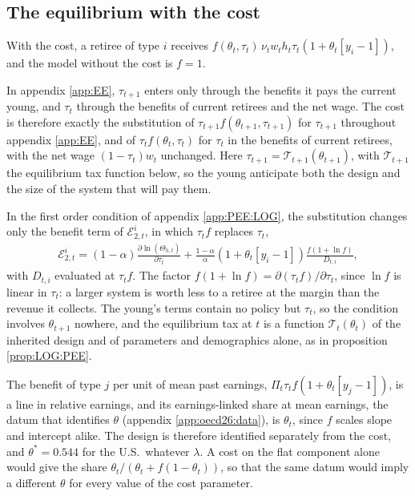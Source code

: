 \subsection{The equilibrium with the cost}\label{app:esc:equilibrium}
With the cost, a retiree of type $i$ receives $f(\theta_t,\tau_t)\,\nu_tw_th_t\tau_t\left(1+\theta_t\left[y_i-1\right]\right)$, and the model without the cost is $f = 1$.

 In appendix \ref{app:EE}, $\tau_{t+1}$ enters only through the benefits it pays the current young, and $\tau_t$ through the benefits of current retirees and the net wage. The cost is therefore exactly the substitution of $\tau_{t+1}f(\theta_{t+1},\tau_{t+1})$ for $\tau_{t+1}$ throughout appendix \ref{app:EE}, and of $\tau_tf(\theta_t,\tau_t)$ for $\tau_t$ in the benefits of current retirees, with the net wage $(1-\tau_t)w_t$ unchanged. Here $\tau_{t+1} = \mathcal{T}_{t+1}(\theta_{t+1})$, with $\mathcal{T}_{t+1}$ the equilibrium tax function below, so the young anticipate both the design and the size of the system that will pay them.

 In the first order condition of appendix \ref{app:PEE:LOG}, the substitution changes only the benefit term of $\mathcal{E}_{2,t}^i$, in which $\tau_tf$ replaces $\tau_t$,
\begin{align}\label{eq:esc:E2}
    \mathcal{E}_{2,t}^i = (1-\alpha)\frac{\partial \ln\left(\Theta_{h,t}\right)}{\partial \tau_t}+\frac{1-\alpha}{\alpha}\left(1+\theta_t\left[y_i-1\right]\right)\frac{f\left(1+\ln f\right)}{D_{t,i}},
\end{align}
with $D_{t,i}$ evaluated at $\tau_tf$. The factor $f(1+\ln f) = \partial(\tau_tf)/\partial\tau_t$, since $\ln f$ is linear in $\tau_t$: a larger system is worth less to a retiree at the margin than the revenue it collects. The young's terms contain no policy but $\tau_t$, so the condition involves $\theta_{t+1}$ nowhere, and the equilibrium tax at $t$ is a function $\mathcal{T}_t(\theta_t)$ of the inherited design and of parameters and demographics alone, as in proposition \ref{prop:LOG:PEE}.

 The benefit of type $j$ per unit of mean past earnings, $\Pi_t\tau_tf\left(1+\theta_t\left[y_j-1\right]\right)$, is a line in relative earnings, and its earnings-linked share at mean earnings, the datum that identifies $\theta$ (appendix \ref{app:oecd26:data}), is $\theta_t$, since $f$ scales slope and intercept alike. The design is therefore identified separately from the cost, and $\theta^{\ast} = 0.544$ for the U.S.\ whatever $\lambda$. A cost on the flat component alone would give the share $\theta_t/\left(\theta_t + f(1-\theta_t)\right)$, so that the same datum would imply a different $\theta$ for every value of the cost parameter.


